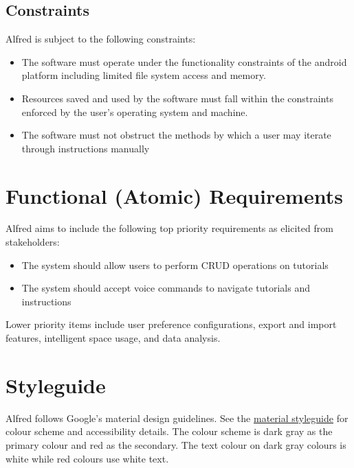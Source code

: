 \documentclass[12pt]{article}
\begin{document}
\subsection{Constraints}

Alfred is subject to the following constraints:

\begin{itemize}

\item The software must operate under the functionality constraints of the android platform including limited file system access and memory.
\item Resources saved and used by the software must fall within the constraints enforced by the user's operating system and machine.
\item The software must not obstruct the methods by which a user may iterate through instructions manually

\end{itemize}

\section{Functional (Atomic) Requirements}

Alfred aims to include the following top priority requirements as elicited from stakeholders:

\begin{itemize}[noitemsep]
\item The system should allow users to perform CRUD operations on tutorials
\item The system should accept voice commands to navigate tutorials and instructions
\end{itemize}

Lower priority items include user preference configurations, export and import features, intelligent space usage, and data analysis.

\section{Styleguide}

Alfred follows Google's material design guidelines. See the \href{https://material.io/color/#!/?view.left=1&view.right=1&primary.color=2e2e2e&secondary.color=f33737}{material styleguide} for colour scheme and accessibility details. The colour scheme is dark gray as the primary colour and red as the secondary. 
The text colour on dark gray colours is white while red colours use white text. 
\end{document}
